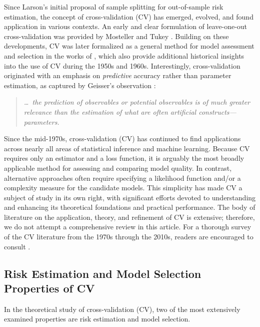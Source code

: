 \documentclass[11pt]{article}
\theoremstyle{plain}
\begin{document}
Since Larson’s initial proposal of sample splitting for out-of-sample risk estimation, the concept of cross-validation (CV) has emerged, evolved, and found application in various contexts. An early and clear formulation of leave-one-out cross-validation was provided by Mosteller and Tukey \citep{mosteller1968data}. Building on these developments, CV was later formalized as a general method for model assessment and selection in the works of \cite{Stone74,Geisser75}, which also provide additional historical insights into the use of CV during the 1950s and 1960s.  
Interestingly, cross-validation originated with an emphasis on \emph{predictive} accuracy rather than parameter estimation, as captured by Geisser’s observation \cite{Geisser75}:
\begin{quote}
\emph{\ldots\ the prediction of observables or potential observables is of much greater relevance than the estimation of what are often artificial constructs—parameters.}
\end{quote}

Since the mid-1970s, cross-validation (CV) has continued to find applications across nearly all areas of statistical inference and machine learning. Because CV requires only an estimator and a loss function, it is arguably the most broadly applicable method for assessing and comparing model quality. In contrast, alternative approaches often require specifying a likelihood function and/or a complexity measure for the candidate models. This simplicity has made CV a subject of study in its own right, with significant efforts devoted to understanding and enhancing its theoretical foundations and practical performance. The body of literature on the application, theory, and refinement of CV is extensive; therefore, we do not attempt a comprehensive review in this article. For a thorough survey of the CV literature from the 1970s through the 2010s, readers are encouraged to consult \cite{arlot2010survey}.

\subsection{Risk Estimation and Model Selection Properties of CV}\label{subsec:1.2-estimation-selection}
In the theoretical study of cross-validation (CV), two of the most extensively examined properties are risk estimation and model selection.
\end{document}
